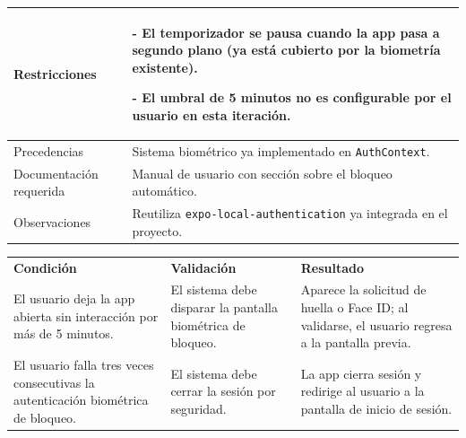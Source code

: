 \begin{tabular}{|p{4.5cm}|p{11cm}|}
\hline
Restricciones &
- El temporizador se pausa cuando la app pasa a segundo plano (ya está cubierto por la biometría existente). \par
- El umbral de 5 minutos no es configurable por el usuario en esta iteración. \\
\hline
Precedencias & Sistema biométrico ya implementado en \texttt{AuthContext}. \\ \hline
Documentación requerida & Manual de usuario con sección sobre el bloqueo automático. \\ \hline
Observaciones & Reutiliza \texttt{expo-local-authentication} ya integrada en el proyecto. \\ \hline
\end{tabular}

\vspace{0.3cm}

\noindent
\begin{tabular}{|p{5.1cm}|p{5.1cm}|p{5.1cm}|}
\hline
\rowcolor{secVerde}\multicolumn{3}{|l|}{\color{white}\textbf{4. CONDICIONES DE PRUEBA}} \\
\hline
\rowcolor{cellGris}\textbf{Condición} & \textbf{Validación} & \textbf{Resultado} \\
\hline
El usuario deja la app abierta sin interacción por más de 5 minutos. &
El sistema debe disparar la pantalla biométrica de bloqueo. &
Aparece la solicitud de huella o Face ID; al validarse, el usuario regresa a la pantalla previa. \\
\hline
El usuario falla tres veces consecutivas la autenticación biométrica de bloqueo. &
El sistema debe cerrar la sesión por seguridad. &
La app cierra sesión y redirige al usuario a la pantalla de inicio de sesión. \\
\hline
\end{tabular}
